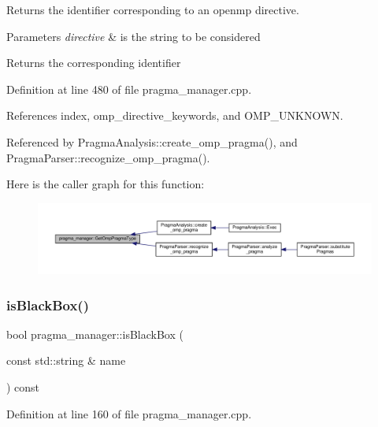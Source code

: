 Returns the identifier corresponding to an openmp directive. 


\begin{DoxyParams}{Parameters}
{\em directive} & is the string to be considered \\
\hline
\end{DoxyParams}
\begin{DoxyReturn}{Returns}
the corresponding identifier 
\end{DoxyReturn}


Definition at line 480 of file pragma\+\_\+manager.\+cpp.



References index, omp\+\_\+directive\+\_\+keywords, and O\+M\+P\+\_\+\+U\+N\+K\+N\+O\+WN.



Referenced by Pragma\+Analysis\+::create\+\_\+omp\+\_\+pragma(), and Pragma\+Parser\+::recognize\+\_\+omp\+\_\+pragma().

Here is the caller graph for this function\+:
\nopagebreak
\begin{figure}[H]
\begin{center}
\leavevmode
\includegraphics[width=350pt]{d2/d1d/classpragma__manager_a7810d8d6ef6bc3ee34d67f209cd277cf_icgraph}
\end{center}
\end{figure}
\mbox{\label{classpragma__manager_ac486a3dc41a97342bb066234ba85a462}} 
\subsubsection{\texorpdfstring{is\+Black\+Box()}{isBlackBox()}}
{\footnotesize\ttfamily bool pragma\+\_\+manager\+::is\+Black\+Box (\begin{DoxyParamCaption}\item[{const std\+::string \&}]{name }\end{DoxyParamCaption}) const}



Definition at line 160 of file pragma\+\_\+manager.\+cpp.



